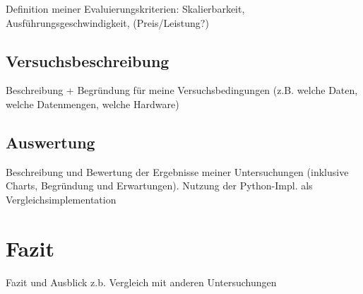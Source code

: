 Definition meiner Evaluierungskriterien:
Skalierbarkeit, Ausführungsgeschwindigkeit, (Preis/Leistung?)

\section{Versuchsbeschreibung}
Beschreibung + Begründung für meine Versuchsbedingungen (z.B. welche Daten, welche Datenmengen, welche Hardware)
\section{Auswertung}
Beschreibung und Bewertung der Ergebnisse meiner Untersuchungen (inklusive Charts, Begründung und Erwartungen). Nutzung der Python-Impl. als Vergleichsimplementation

\chapter{Fazit}
Fazit und Ausblick
z.b. Vergleich mit anderen Untersuchungen

